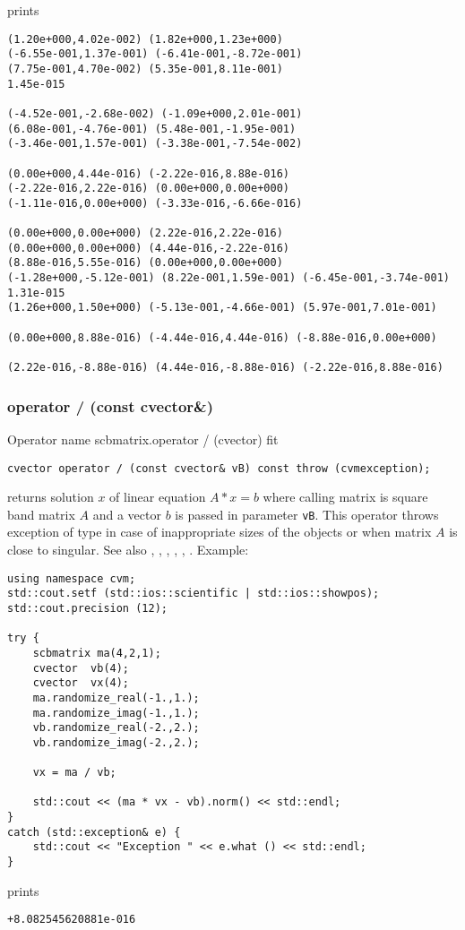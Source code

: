 prints
\begin{Verbatim}
(1.20e+000,4.02e-002) (1.82e+000,1.23e+000)
(-6.55e-001,1.37e-001) (-6.41e-001,-8.72e-001)
(7.75e-001,4.70e-002) (5.35e-001,8.11e-001)
1.45e-015

(-4.52e-001,-2.68e-002) (-1.09e+000,2.01e-001)
(6.08e-001,-4.76e-001) (5.48e-001,-1.95e-001)
(-3.46e-001,1.57e-001) (-3.38e-001,-7.54e-002)

(0.00e+000,4.44e-016) (-2.22e-016,8.88e-016)
(-2.22e-016,2.22e-016) (0.00e+000,0.00e+000)
(-1.11e-016,0.00e+000) (-3.33e-016,-6.66e-016)

(0.00e+000,0.00e+000) (2.22e-016,2.22e-016)
(0.00e+000,0.00e+000) (4.44e-016,-2.22e-016)
(8.88e-016,5.55e-016) (0.00e+000,0.00e+000)
(-1.28e+000,-5.12e-001) (8.22e-001,1.59e-001) (-6.45e-001,-3.74e-001)
1.31e-015
(1.26e+000,1.50e+000) (-5.13e-001,-4.66e-001) (5.97e-001,7.01e-001)

(0.00e+000,8.88e-016) (-4.44e-016,4.44e-016) (-8.88e-016,0.00e+000)

(2.22e-016,-8.88e-016) (4.44e-016,-8.88e-016) (-2.22e-016,8.88e-016)
\end{Verbatim}
\newpage




\subsubsection{operator / (const cvector\&)}
Operator%
\pdfdest name {scbmatrix.operator / (cvector)} fit
\begin{verbatim}
cvector operator / (const cvector& vB) const throw (cvmexception);
\end{verbatim}
returns solution $x$ of linear equation
$A*x=b$ where calling matrix is square band matrix $A$
and a vector $b$ is passed in parameter \verb"vB".
This operator throws exception 
of type 
in case of inappropriate sizes
of the objects or when  matrix $A$ is close to singular.
See also , 
, 
, 
, , .
Example:
\begin{Verbatim}
using namespace cvm;
std::cout.setf (std::ios::scientific | std::ios::showpos);
std::cout.precision (12);

try {
    scbmatrix ma(4,2,1);
    cvector  vb(4);
    cvector  vx(4);
    ma.randomize_real(-1.,1.);
    ma.randomize_imag(-1.,1.);
    vb.randomize_real(-2.,2.);
    vb.randomize_imag(-2.,2.);

    vx = ma / vb;

    std::cout << (ma * vx - vb).norm() << std::endl;
}
catch (std::exception& e) {
    std::cout << "Exception " << e.what () << std::endl;
}
\end{Verbatim}
prints
\begin{Verbatim}
+8.082545620881e-016
\end{Verbatim}
\newpage







